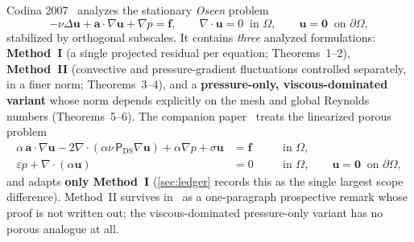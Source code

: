 \documentclass[11pt]{article}
\theoremstyle{remark}
\newcommand{\bu}{\boldsymbol{u}}
\newcommand{\ba}{\boldsymbol{a}}
\newcommand{\bff}{\boldsymbol{f}}
\newcommand{\bze}{\boldsymbol{0}}
\newcommand{\ViscProj}{\mathsf{P}_{\mathrm{DS}}}
\begin{document}
Codina 2007~\cite{Codina2008} analyzes the stationary \emph{Oseen} problem
\begin{equation}
  \label{eq:oseen}
  -\nu\Delta\bu + \ba\cdot\nabla\bu + \nabla p = \bff,
  \qquad \nabla\cdot\bu = 0 \ \text{ in }\Omega, \qquad \bu = \bze \ \text{ on }\partial\Omega,
\end{equation}
stabilized by orthogonal subscales. It contains \emph{three} analyzed formulations:
\textbf{Method~I} (a single projected residual per equation; Theorems~1--2), \textbf{Method~II}
(convective and pressure-gradient fluctuations controlled separately, in a finer norm;
Theorems~3--4), and a \textbf{pressure-only, viscous-dominated variant} whose norm depends
explicitly on the mesh and global Reynolds numbers (Theorems~5--6). The companion
paper~\cite{companion,osgsnote} treats the linearized porous problem
\begin{subequations}
\label{eq:porous}
\begin{alignat}{2}
  \alpha\,\ba\cdot\nabla\bu - 2\nabla\cdot(\alpha\nu\,\ViscProj\nabla\bu)
  + \alpha\nabla p + \sigma\bu &= \bff && \quad\text{in }\Omega, \\
  \varepsilon p + \nabla\cdot(\alpha\bu) &= 0 && \quad\text{in }\Omega,
  \qquad \bu=\bze \ \text{ on }\partial\Omega,
\end{alignat}
\end{subequations}
and adapts \textbf{only Method~I} (\cref{sec:ledger} records this as the single largest
scope difference). Method~II survives in~\cite{osgsnote} as a one-paragraph prospective
remark whose proof is not written out; the viscous-dominated pressure-only variant has no
porous analogue at all.
\end{document}
